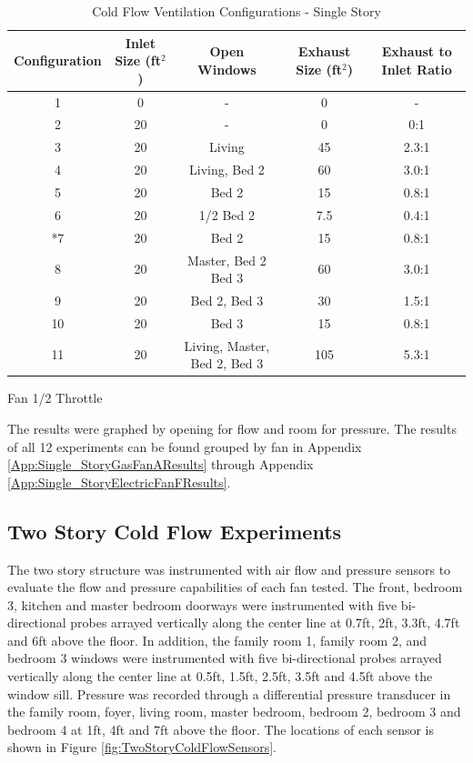 \documentclass{article}
\begin{document}
\begin{table} [H]
	\caption{Cold Flow Ventilation Configurations - Single Story}
	\begin{tabular}{|c|c|c|c|c|}
		\hline
		Configuration & Inlet Size (ft$^2$) & Open Windows & Exhaust Size (ft$^2$) & Exhaust to Inlet Ratio \\ \hline \hline
		1 & 0 & - & 0 & - \\ \hline
		2 & 20 & - & 0 & 0:1 \\ \hline
		3 & 20 & Living & 45 & 2.3:1 \\ \hline
		4 & 20 & Living, Bed 2 & 60 & 3.0:1 \\ \hline
		5 & 20 & Bed 2 & 15 & 0.8:1 \\ \hline
		6 & 20 & 1/2 Bed 2 & 7.5 & 0.4:1 \\ \hline
		*7 & 20 & Bed 2 & 15 & 0.8:1 \\ \hline
		8 & 20 & Master, Bed 2 Bed 3 & 60 & 3.0:1 \\ \hline
		9 & 20 & Bed 2, Bed 3 & 30 & 1.5:1 \\ \hline
		10 & 20 & Bed 3 & 15 & 0.8:1 \\ \hline
		11 & 20 & Living, Master, Bed 2, Bed 3 & 105 & 5.3:1 \\ \hline
	\end{tabular}
	\begin{tablenotes}
		\item *Fan 1/2 Throttle
	\end{tablenotes}
	\label{tab:ColdFlowConfig_SingleStory}
\end{table}


The results were graphed by opening for flow and room for pressure. The results of all 12 experiments can be found grouped by fan in Appendix \ref{App:Single_StoryGasFanAResults} through Appendix \ref{App:Single_StoryElectricFanFResults}. 

\subsection{Two Story Cold Flow Experiments}
The two story structure was instrumented with air flow and pressure sensors to evaluate the flow and pressure capabilities of each fan tested. The front, bedroom 3, kitchen and master bedroom doorways were instrumented with five bi-directional probes arrayed vertically along the center line at 0.7ft, 2ft, 3.3ft, 4.7ft and 6ft above the floor. In addition, the family room 1, family room 2, and bedroom 3 windows were instrumented with five bi-directional probes arrayed vertically along the center line at 0.5ft, 1.5ft, 2.5ft, 3.5ft and 4.5ft above the window sill. Pressure was recorded through a differential pressure transducer in the family room, foyer, living room, master bedroom, bedroom 2, bedroom 3 and bedroom 4 at 1ft, 4ft and 7ft above the floor. The locations of each sensor is shown in Figure \ref{fig:TwoStoryColdFlowSensors}. 
\end{document}
